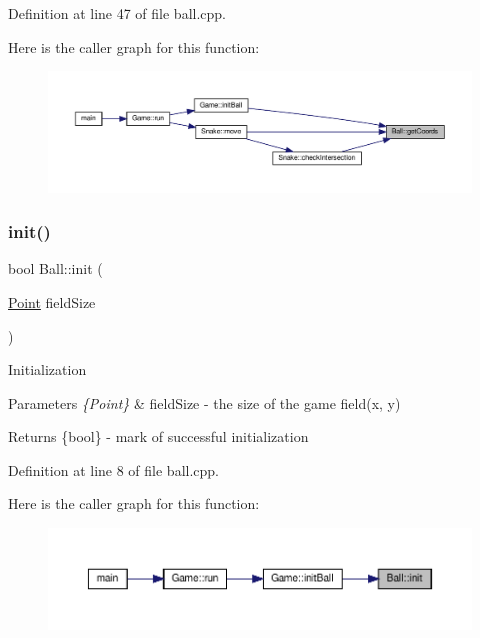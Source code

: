 Definition at line 47 of file ball.\+cpp.

Here is the caller graph for this function\+:
\nopagebreak
\begin{figure}[H]
\begin{center}
\leavevmode
\includegraphics[width=350pt]{class_ball_a14b9a607402be58e7a0a0ab053df5f82_icgraph}
\end{center}
\end{figure}
\mbox{\label{class_ball_a1907f13fdfb320a19180efec2a56e39c}} 
\subsubsection{\texorpdfstring{init()}{init()}}
{\footnotesize\ttfamily bool Ball\+::init (\begin{DoxyParamCaption}\item[{\mbox{\hyperlink{common_8h_aa9cfdb80b4ca12013a2de8a3b9b97981}{Point}}}]{field\+Size }\end{DoxyParamCaption})}

Initialization 
\begin{DoxyParams}{Parameters}
{\em \{\+Point\}} & field\+Size -\/ the size of the game field(x, y) \\
\hline
\end{DoxyParams}
\begin{DoxyReturn}{Returns}
\{bool\} -\/ mark of successful initialization 
\end{DoxyReturn}


Definition at line 8 of file ball.\+cpp.

Here is the caller graph for this function\+:
\nopagebreak
\begin{figure}[H]
\begin{center}
\leavevmode
\includegraphics[width=350pt]{class_ball_a1907f13fdfb320a19180efec2a56e39c_icgraph}
\end{center}
\end{figure}


